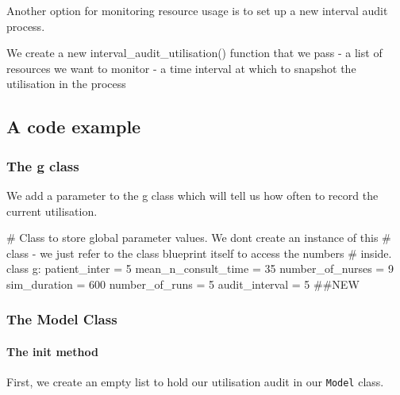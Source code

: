 \documentclass[
  letterpaper,
  DIV=11,
  numbers=noendperiod]{scrreprt}
\let\oldparagraph\paragraph
\renewcommand{\paragraph}[1]{\oldparagraph{#1}\mbox{}}
\newenvironment{Shaded}{}{}
\newcommand{\CommentTok}[1]{\textcolor[rgb]{0.42,0.45,0.49}{#1}}
\newcommand{\DecValTok}[1]{\textcolor[rgb]{0.00,0.36,0.77}{#1}}
\newcommand{\KeywordTok}[1]{\textcolor[rgb]{0.84,0.23,0.29}{#1}}
\newcommand{\NormalTok}[1]{\textcolor[rgb]{0.14,0.16,0.18}{#1}}
\newcommand{\OperatorTok}[1]{\textcolor[rgb]{0.14,0.16,0.18}{#1}}
\begin{document}
Another option for monitoring resource usage is to set up a new interval
audit process.

We create a new interval\_audit\_utilisation() function that we pass - a
list of resources we want to monitor - a time interval at which to
snapshot the utilisation in the process

\subsection{A code example}\label{a-code-example-1}

\subsubsection{The g class}\label{the-g-class-8}

We add a parameter to the g class which will tell us how often to record
the current utilisation.

\begin{Shaded}
\begin{Highlighting}[]
\CommentTok{\# Class to store global parameter values.  We don\textquotesingle{}t create an instance of this}
\CommentTok{\# class {-} we just refer to the class blueprint itself to access the numbers}
\CommentTok{\# inside.}
\KeywordTok{class}\NormalTok{ g:}
\NormalTok{    patient\_inter }\OperatorTok{=} \DecValTok{5}
\NormalTok{    mean\_n\_consult\_time }\OperatorTok{=} \DecValTok{35}
\NormalTok{    number\_of\_nurses }\OperatorTok{=} \DecValTok{9}
\NormalTok{    sim\_duration }\OperatorTok{=} \DecValTok{600}
\NormalTok{    number\_of\_runs }\OperatorTok{=} \DecValTok{5}
\NormalTok{    audit\_interval }\OperatorTok{=} \DecValTok{5} \CommentTok{\#\#NEW}
\end{Highlighting}
\end{Shaded}

\subsubsection{The Model Class}\label{the-model-class-8}

\paragraph{\texorpdfstring{The \textbf{init}
method}{The init method}}\label{the-init-method-8}

First, we create an empty list to hold our utilisation audit in our
\texttt{Model} class.
\end{document}
